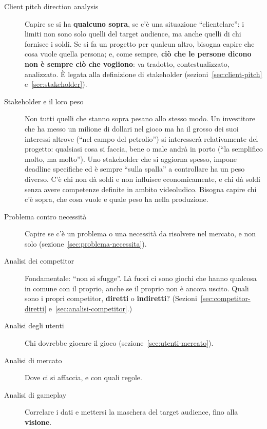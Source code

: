 \begin{description}
  \item[Client pitch direction analysis] Capire se si ha \textbf{qualcuno
        sopra}, se c'è una situazione ``clientelare'': i limiti non sono solo
        quelli del target audience, ma anche quelli di chi fornisce i soldi.
        Se si fa un progetto per qualcun altro, bisogna capire che cosa vuole
        quella persona; e, come sempre, \textbf{ciò che le persone dicono non è
        sempre ciò che vogliono}: va tradotto, contestualizzato, analizzato.
        È legata alla definizione di stakeholder
        (sezioni~\ref{sec:client-pitch} e~\ref{sec:stakeholder}).
  \item[Stakeholder e il loro peso] Non tutti quelli che stanno sopra pesano
        allo stesso modo. Un investitore che ha messo un milione di dollari
        nel gioco ma ha il grosso dei suoi interessi altrove (``nel campo del
        petrolio'') si interesserà relativamente del progetto: qualsiasi cosa
        si faccia, bene o male andrà in porto (``la semplifico molto, ma
        molto''). Uno stakeholder che si aggiorna spesso, impone deadline
        specifiche ed è sempre ``sulla spalla'' a controllare ha un peso
        diverso. C'è chi non dà soldi e non influisce economicamente, e chi
        dà soldi senza avere competenze definite in ambito videoludico.
        Bisogna capire chi c'è sopra, che cosa vuole e quale peso ha nella
        produzione.
  \item[Problema contro necessità] Capire se c'è un problema o una
        necessità da risolvere nel mercato, e non solo
        (sezione~\ref{sec:problema-necessita}).
  \item[Analisi dei competitor] Fondamentale: ``non si sfugge''. Là fuori ci
        sono giochi che hanno qualcosa in comune con il proprio, anche se il
        proprio non è ancora uscito. Quali sono i propri competitor,
        \textbf{diretti} o \textbf{indiretti}? (Sezioni~\ref{sec:competitor-diretti}
        e~\ref{sec:analisi-competitor}.)
  \item[Analisi degli utenti] Chi dovrebbe giocare il gioco
        (sezione~\ref{sec:utenti-mercato}).
  \item[Analisi di mercato] Dove ci si affaccia, e con quali regole.
  \item[Analisi di gameplay] Correlare i dati e mettersi la maschera del
        target audience, fino alla \textbf{visione}.
\end{description}

